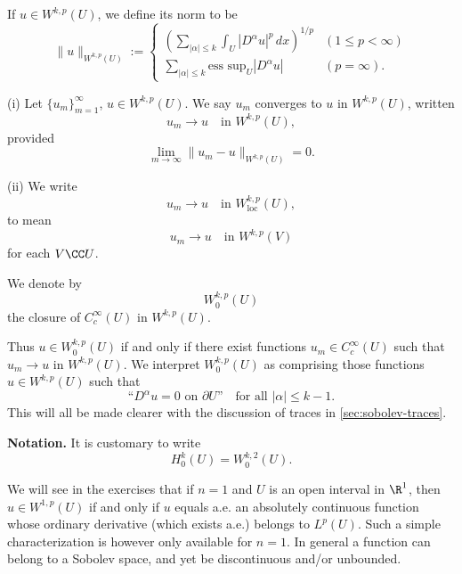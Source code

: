 \begin{definition}[Norm on $W^{k,p}(U)$]
\label{def:sobolev-norm}
If $u \in W^{k,p}(U)$, we define its norm to be
$$\|u\|_{W^{k,p}(U)} := \begin{cases}
\left(\sum_{|\alpha| \le k} \int_U |D^\alpha u|^p\,dx\right)^{1/p} & (1 \le p < \infty) \\
\sum_{|\alpha| \le k} \text{ess sup}_U |D^\alpha u| & (p = \infty).
\end{cases}$$
\end{definition}

\begin{definition}
\label{def:sobolev-convergence}
(i) Let $\{u_m\}_{m=1}^\infty$, $u \in W^{k,p}(U)$. We say $u_m$ converges to $u$ in $W^{k,p}(U)$, written
$$u_m \to u \quad \text{in } W^{k,p}(U),$$
provided
$$\lim_{m \to \infty} \|u_m - u\|_{W^{k,p}(U)} = 0.$$

(ii) We write
$$u_m \to u \quad \text{in } W^{k,p}_{\text{loc}}(U),$$
to mean
$$u_m \to u \quad \text{in } W^{k,p}(V)$$
for each $V \CC U$.
\end{definition}

\begin{definition}
\label{def:sobolev-space-zero-boundary}
We denote by
$$W_0^{k,p}(U)$$
the closure of $C_c^\infty(U)$ in $W^{k,p}(U)$.
\end{definition}

Thus $u \in W_0^{k,p}(U)$ if and only if there exist functions $u_m \in C_c^\infty(U)$ such that $u_m \to u$ in $W^{k,p}(U)$. We interpret $W_0^{k,p}(U)$ as comprising those functions $u \in W^{k,p}(U)$ such that
$$\text{``}D^\alpha u = 0 \text{ on } \partial U \text{''} \quad \text{for all } |\alpha| \le k - 1.$$
This will all be made clearer with the discussion of traces in \cref{sec:sobolev-traces}.

\textbf{Notation.} It is customary to write
$$H^k_0(U) = W^{k,2}_0(U).$$

We will see in the exercises that if $n = 1$ and $U$ is an open interval in $\R^1$, then $u \in W^{1,p}(U)$ if and only if $u$ equals a.e. an absolutely continuous function whose ordinary derivative (which exists a.e.) belongs to $L^p(U)$. Such a simple characterization is however only available for $n = 1$. In general a function can belong to a Sobolev space, and yet be discontinuous and/or unbounded.

